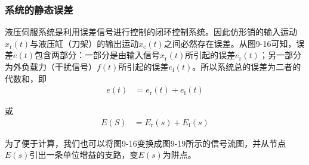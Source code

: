 \subsubsection{系统的静态误差}

液压伺服系统是利用误差信号进行控制的闭环控制系统。因此仿形销的输入运动$x_{\text{r}}(t)$与液压缸（刀架）的输出运动$x_{\text{c}}(t)$之间必然存在误差。从图9-16可知，误差$e(t)$包含两部分：一部分是由输入信号$x_{\text{r}}(t)$所引起的误差$e_{\text{r}}(t)$；另一部分为外负载力（干扰信号）$f(t)$所引起的误差$e_{\text{f}}(t)$。所以系统总的误差为二者的代数和，即
\begin{align*}
    e(t)&=e_{\text{r}}(t)+e_{\text{f}}(t)
\end{align*}

\noindent 或
\begin{align}
    E(S)&=E_{\text{r}}(s)+E_{\text{f}}(s)
\end{align}

\noindent 为了便于计算，我们也可以将图9-16变换成图9-19所示的信号流图，并从节点$E(s)$引出一条单位增益的支路，变$E(s)$为阱点。
